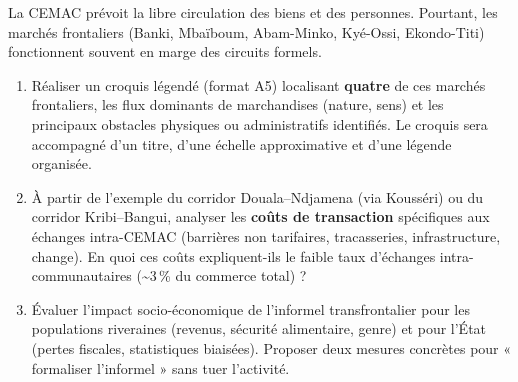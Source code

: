 \documentclass[11pt]{article}
\begin{document}
\begin{exercice}
La CEMAC prévoit la libre circulation des biens et des personnes. Pourtant, les marchés frontaliers (Banki, Mbaïboum, Abam-Minko, Kyé-Ossi, Ekondo-Titi) fonctionnent souvent en marge des circuits formels.

\begin{enumerate}
    \item Réaliser un croquis légendé (format A5) localisant \textbf{quatre} de ces marchés frontaliers, les flux dominants de marchandises (nature, sens) et les principaux obstacles physiques ou administratifs identifiés. Le croquis sera accompagné d'un titre, d'une échelle approximative et d'une légende organisée.
    \item À partir de l'exemple du corridor Douala--Ndjamena (via Kousséri) ou du corridor Kribi--Bangui, analyser les \textbf{coûts de transaction} spécifiques aux échanges intra-CEMAC (barrières non tarifaires, tracasseries, infrastructure, change). En quoi ces coûts expliquent-ils le faible taux d'échanges intra-communautaires (\textasciitilde 3\,\% du commerce total) ?
    \item Évaluer l'impact socio-économique de l'informel transfrontalier pour les populations riveraines (revenus, sécurité alimentaire, genre) et pour l'État (pertes fiscales, statistiques biaisées). Proposer deux mesures concrètes pour « formaliser l'informel » sans tuer l'activité.
\end{enumerate}
\end{exercice}
\end{document}
